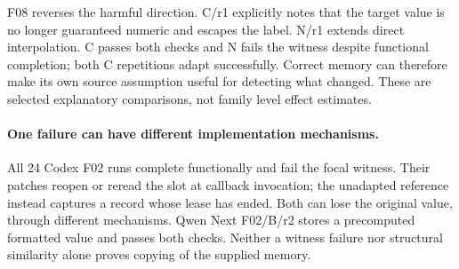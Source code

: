 F08 reverses the harmful direction. C/r1 explicitly notes that the target value is no longer guaranteed numeric and escapes the label. N/r1 extends direct interpolation. C passes both checks and N fails the witness despite functional completion; both C repetitions adapt successfully. Correct memory can therefore make its own source assumption useful for detecting what changed. These are selected explanatory comparisons, not family level effect estimates.

\paragraph{One failure can have different implementation mechanisms.}
All 24 Codex F02 runs complete functionally and fail the focal witness. Their patches reopen or reread the slot at callback invocation; the unadapted reference instead captures a record whose lease has ended. Both can lose the original value, through different mechanisms. Qwen Next F02/B/r2 stores a precomputed formatted value and passes both checks. Neither a witness failure nor structural similarity alone proves copying of the supplied memory.

